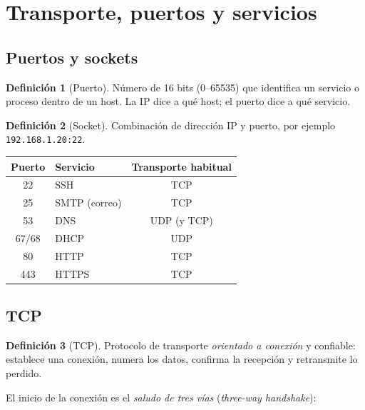 \documentclass[11pt,a4paper]{article}
\theoremstyle{definition}
\newtheorem{definicion}{Definición}[section]
\theoremstyle{remark}
\begin{document}
\section{Transporte, puertos y servicios}\label{sec:transporte}

\subsection{Puertos y sockets}

\begin{definicion}[Puerto]
Número de 16 bits (0--65535) que identifica un servicio o proceso dentro de un host. La IP dice a qué host; el puerto dice a qué servicio.
\end{definicion}

\begin{definicion}[Socket]
Combinación de dirección IP y puerto, por ejemplo \texttt{192.168.1.20:22}.
\end{definicion}

\begin{center}
\begin{tabular}{@{}clc@{}}
\toprule
\textbf{Puerto} & \textbf{Servicio} & \textbf{Transporte habitual}\\
\midrule
22 & SSH & TCP\\
25 & SMTP (correo) & TCP\\
53 & DNS & UDP (y TCP)\\
67/68 & DHCP & UDP\\
80 & HTTP & TCP\\
443 & HTTPS & TCP\\
\bottomrule
\end{tabular}
\end{center}

\subsection{TCP}

\begin{definicion}[TCP]
Protocolo de transporte \emph{orientado a conexión} y confiable: establece una conexión, numera los datos, confirma la recepción y retransmite lo perdido.
\end{definicion}

El inicio de la conexión es el \emph{saludo de tres vías} (\textit{three-way handshake}):
\end{document}
